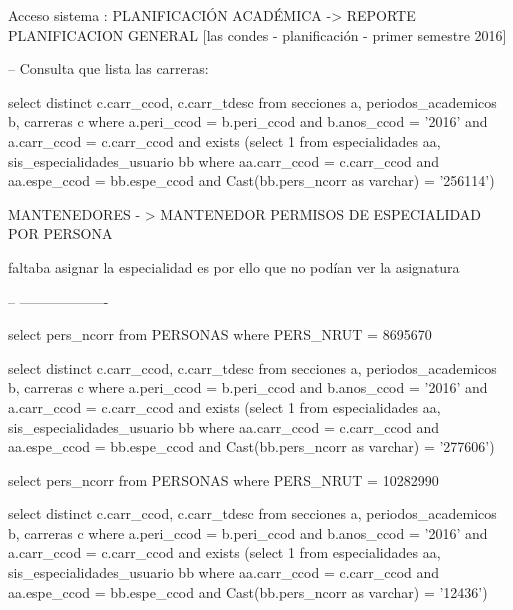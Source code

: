 


Acceso sistema : PLANIFICACIÓN ACADÉMICA -> REPORTE PLANIFICACION GENERAL [las condes - planificación - primer semestre 2016]

-- Consulta que lista las carreras:

select distinct c.carr_ccod, 
                c.carr_tdesc 
from   secciones a, 
       periodos_academicos b, 
       carreras c 
where  a.peri_ccod = b.peri_ccod 
       and b.anos_ccod = '2016' 
       and a.carr_ccod = c.carr_ccod 
       and exists (select 1 
                   from   especialidades aa, 
                          sis_especialidades_usuario bb 
                   where  aa.carr_ccod = c.carr_ccod 
                          and aa.espe_ccod = bb.espe_ccod 
                          and Cast(bb.pers_ncorr as varchar) = '256114') 
						  
						  
MANTENEDORES - > MANTENEDOR PERMISOS DE ESPECIALIDAD POR PERSONA

faltaba asignar la especialidad es por ello que no podían ver la asignatura		








-- -------------------

select pers_ncorr from PERSONAS where PERS_NRUT = 8695670



select distinct c.carr_ccod, 
                c.carr_tdesc 
from   secciones a, 
       periodos_academicos b, 
       carreras c 
where  a.peri_ccod = b.peri_ccod 
       and b.anos_ccod = '2016' 
       and a.carr_ccod = c.carr_ccod 
       and exists (select 1 
                   from   especialidades aa, 
                          sis_especialidades_usuario bb 
                   where  aa.carr_ccod = c.carr_ccod 
                          and aa.espe_ccod = bb.espe_ccod 
                          and Cast(bb.pers_ncorr as varchar) = '277606') 
                          
                          
                          
                          

select pers_ncorr from PERSONAS where PERS_NRUT = 10282990



select distinct c.carr_ccod, 
                c.carr_tdesc 
from   secciones a, 
       periodos_academicos b, 
       carreras c 
where  a.peri_ccod = b.peri_ccod 
       and b.anos_ccod = '2016' 
       and a.carr_ccod = c.carr_ccod 
       and exists (select 1 
                   from   especialidades aa, 
                          sis_especialidades_usuario bb 
                   where  aa.carr_ccod = c.carr_ccod 
                          and aa.espe_ccod = bb.espe_ccod 
                          and Cast(bb.pers_ncorr as varchar) = '12436')   
                          

